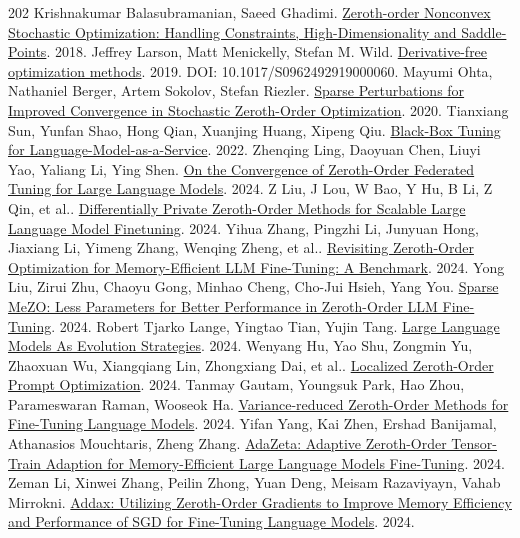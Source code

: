 \begin{thebibliography}{202}
 Krishnakumar Balasubramanian, Saeed Ghadimi. \href{https://arxiv.org/abs/1809.06474v2}{Zeroth-order Nonconvex Stochastic Optimization: Handling Constraints, High-Dimensionality and Saddle-Points}. 2018.
 Jeffrey Larson, Matt Menickelly, Stefan M. Wild. \href{https://arxiv.org/abs/1904.11585v2}{Derivative-free optimization methods}. 2019. DOI: 10.1017/S0962492919000060.
 Mayumi Ohta, Nathaniel Berger, Artem Sokolov, Stefan Riezler. \href{https://arxiv.org/abs/2006.01759v2}{Sparse Perturbations for Improved Convergence in Stochastic Zeroth-Order Optimization}. 2020.
 Tianxiang Sun, Yunfan Shao, Hong Qian, Xuanjing Huang, Xipeng Qiu. \href{https://arxiv.org/abs/2201.03514}{Black-Box Tuning for Language-Model-as-a-Service}. 2022.
 Zhenqing Ling, Daoyuan Chen, Liuyi Yao, Yaliang Li, Ying Shen. \href{https://arxiv.org/abs/2402.05926v3}{On the Convergence of Zeroth-Order Federated Tuning for Large Language Models}. 2024.
 Z Liu, J Lou, W Bao, Y Hu, B Li, Z Qin, et al.. \href{https://arxiv.org/abs/2402.07818v6}{Differentially Private Zeroth-Order Methods for Scalable Large Language Model Finetuning}. 2024.
 Yihua Zhang, Pingzhi Li, Junyuan Hong, Jiaxiang Li, Yimeng Zhang, Wenqing Zheng, et al.. \href{https://arxiv.org/abs/2402.11592v3}{Revisiting Zeroth-Order Optimization for Memory-Efficient LLM Fine-Tuning: A Benchmark}. 2024.
 Yong Liu, Zirui Zhu, Chaoyu Gong, Minhao Cheng, Cho-Jui Hsieh, Yang You. \href{https://arxiv.org/abs/2402.15751v2}{Sparse MeZO: Less Parameters for Better Performance in Zeroth-Order LLM Fine-Tuning}. 2024.
 Robert Tjarko Lange, Yingtao Tian, Yujin Tang. \href{https://arxiv.org/abs/2402.18381v1}{Large Language Models As Evolution Strategies}. 2024.
 Wenyang Hu, Yao Shu, Zongmin Yu, Zhaoxuan Wu, Xiangqiang Lin, Zhongxiang Dai, et al.. \href{https://arxiv.org/abs/2403.02993v1}{Localized Zeroth-Order Prompt Optimization}. 2024.
 Tanmay Gautam, Youngsuk Park, Hao Zhou, Parameswaran Raman, Wooseok Ha. \href{https://arxiv.org/abs/2404.08080v1}{Variance-reduced Zeroth-Order Methods for Fine-Tuning Language Models}. 2024.
 Yifan Yang, Kai Zhen, Ershad Banijamal, Athanasios Mouchtaris, Zheng Zhang. \href{https://arxiv.org/abs/2406.18060v3}{AdaZeta: Adaptive Zeroth-Order Tensor-Train Adaption for Memory-Efficient Large Language Models Fine-Tuning}. 2024.
 Zeman Li, Xinwei Zhang, Peilin Zhong, Yuan Deng, Meisam Razaviyayn, Vahab Mirrokni. \href{https://arxiv.org/abs/2410.06441v1}{Addax: Utilizing Zeroth-Order Gradients to Improve Memory Efficiency and Performance of SGD for Fine-Tuning Language Models}. 2024.

\end{thebibliography}
